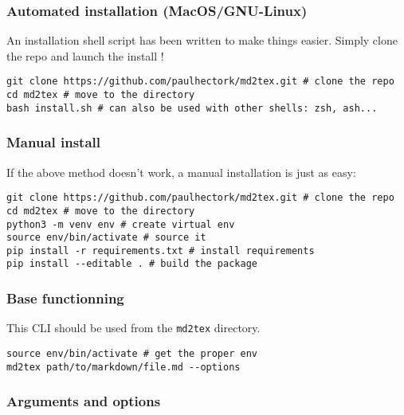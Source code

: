 \subsubsection{Automated installation (MacOS/GNU-Linux)}

An installation shell script has been written to make things easier.
Simply clone the repo and launch the install !

\begin{listing}[h!]
   \begin{verbatim}
git clone https://github.com/paulhectork/md2tex.git # clone the repo
cd md2tex # move to the directory
bash install.sh # can also be used with other shells: zsh, ash...

   \end{verbatim}
\end{listing}
\subsubsection{Manual install}

If the above method doesn't work, a manual installation is just as easy:

\begin{listing}[h!]
   \begin{verbatim}
git clone https://github.com/paulhectork/md2tex.git # clone the repo
cd md2tex # move to the directory
python3 -m venv env # create virtual env
source env/bin/activate # source it
pip install -r requirements.txt # install requirements
pip install --editable . # build the package

   \end{verbatim}
\end{listing}
\subsubsection{Base functionning}

This CLI should be used from the \texttt{md2tex} directory.

\begin{listing}[h!]
   \begin{verbatim}
source env/bin/activate # get the proper env
md2tex path/to/markdown/file.md --options

   \end{verbatim}
\end{listing}
\subsubsection{Arguments and options}

